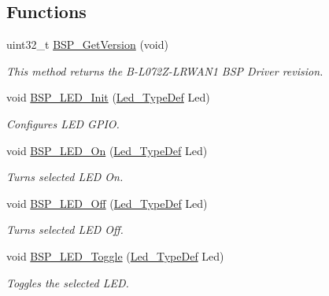 \subsection*{Functions}
\begin{DoxyCompactItemize}
\item 
uint32\+\_\+t \hyperlink{group__B-L072Z-LRWAN1__LOW__LEVEL__Private__Defines_ga65d13608f7010a8068614154cb142cd6}{B\+S\+P\+\_\+\+Get\+Version} (void)
\begin{DoxyCompactList}\small\item\em This method returns the B-\/\+L072\+Z-\/\+L\+R\+W\+A\+N1 B\+SP Driver revision. \end{DoxyCompactList}\item 
void \hyperlink{group__B-L072Z-LRWAN1__LOW__LEVEL__Private__Defines_gab58a4f16a476a53653c5c400e3bed158}{B\+S\+P\+\_\+\+L\+E\+D\+\_\+\+Init} (\hyperlink{group__B-L072Z-LRWAN1__LOW__LEVEL__Exported__Types_gaa059704b7ca945eb9c1e7f2c3d03fecd}{Led\+\_\+\+Type\+Def} Led)
\begin{DoxyCompactList}\small\item\em Configures L\+ED G\+P\+IO. \end{DoxyCompactList}\item 
void \hyperlink{group__B-L072Z-LRWAN1__LOW__LEVEL__Private__Defines_gaee9c16b16384834c69efabf58f423d6f}{B\+S\+P\+\_\+\+L\+E\+D\+\_\+\+On} (\hyperlink{group__B-L072Z-LRWAN1__LOW__LEVEL__Exported__Types_gaa059704b7ca945eb9c1e7f2c3d03fecd}{Led\+\_\+\+Type\+Def} Led)
\begin{DoxyCompactList}\small\item\em Turns selected L\+ED On. \end{DoxyCompactList}\item 
void \hyperlink{group__B-L072Z-LRWAN1__LOW__LEVEL__Private__Defines_gaef268680154ca15c45066d64d41f9467}{B\+S\+P\+\_\+\+L\+E\+D\+\_\+\+Off} (\hyperlink{group__B-L072Z-LRWAN1__LOW__LEVEL__Exported__Types_gaa059704b7ca945eb9c1e7f2c3d03fecd}{Led\+\_\+\+Type\+Def} Led)
\begin{DoxyCompactList}\small\item\em Turns selected L\+ED Off. \end{DoxyCompactList}\item 
void \hyperlink{group__B-L072Z-LRWAN1__LOW__LEVEL__Private__Defines_ga1b9eabba7d498f41d6f16587ec0f9732}{B\+S\+P\+\_\+\+L\+E\+D\+\_\+\+Toggle} (\hyperlink{group__B-L072Z-LRWAN1__LOW__LEVEL__Exported__Types_gaa059704b7ca945eb9c1e7f2c3d03fecd}{Led\+\_\+\+Type\+Def} Led)
\begin{DoxyCompactList}\small\item\em Toggles the selected L\+ED. \end{DoxyCompactList}\item 

\end{DoxyCompactItemize}
